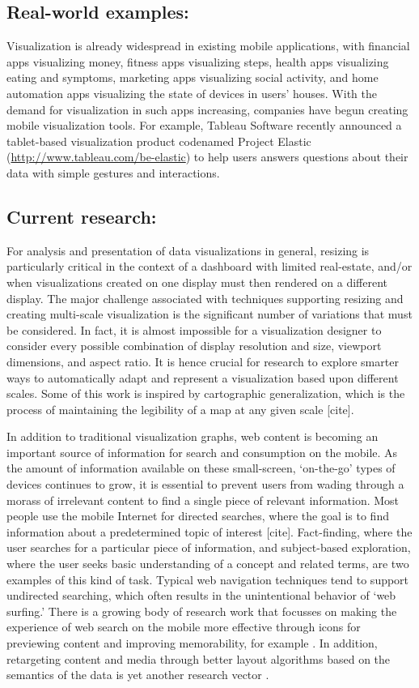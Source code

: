 \documentclass{sigchi-ext}
\begin{document}
\subsection{Real-world examples:} Visualization is already widespread in existing mobile applications, with financial apps visualizing money, fitness apps visualizing steps, health apps visualizing eating and symptoms, marketing apps visualizing social activity, and home automation apps visualizing the state of devices in users' houses. With the demand for visualization in such apps increasing, companies have begun creating mobile visualization tools. For example, Tableau Software recently announced a tablet-based visualization product codenamed Project Elastic (\url{http://www.tableau.com/be-elastic}) to help users answers questions about their data with simple gestures and interactions.

\subsection{Current research:} For analysis and presentation of data visualizations in general, resizing is particularly critical in the context of a dashboard with limited real-estate, and/or when visualizations created on one display must then rendered on a different display. The major challenge associated with techniques supporting resizing and creating multi-scale visualization is the significant number of variations that must be considered. In fact, it is almost impossible for a visualization designer to consider every possible combination of display resolution and size, viewport dimensions, and aspect ratio. It is hence crucial for research to explore smarter ways to automatically adapt and represent a visualization based upon different scales. Some of this work is inspired by cartographic generalization, which is the process of maintaining the legibility of a map at any given scale [cite]. 

In addition to traditional visualization graphs, web content is becoming an important source of information for search and consumption on the mobile. As the amount of information available on these small-screen, `on-the-go' types of devices continues to grow, it is essential to prevent users from wading through a morass of irrelevant content to find a single piece of relevant information. Most people use the mobile Internet for directed searches, where the goal is to find information about a predetermined topic of interest [cite]. Fact-finding, where the user searches for a particular piece of information, and subject-based exploration, where the user seeks basic understanding of a concept and related terms, are two examples of this kind of task. Typical web navigation techniques tend to support undirected searching, which often results in the unintentional behavior of `web surfing.' There is a growing body of research work that focusses on making the experience of web search on the mobile more effective through icons for previewing content and improving memorability, for example \cite{Setlur:SVM:2005,Setlur:2011}. In addition, retargeting content and media through better layout algorithms based on the semantics of the data is yet another research vector \cite{Setlur2007}.
\end{document}
